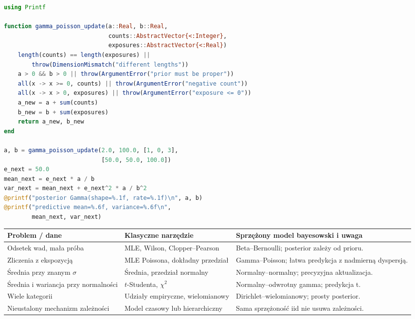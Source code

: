 \begin{lstlisting}[language=Julia,caption={Kompletny program: aktualizacja sprzężona i predykcja gamma--Poisson (Julia, biblioteka standardowa).}]
using Printf

function gamma_poisson_update(a::Real, b::Real,
                              counts::AbstractVector{<:Integer},
                              exposures::AbstractVector{<:Real})
    length(counts) == length(exposures) ||
        throw(DimensionMismatch("different lengths"))
    a > 0 && b > 0 || throw(ArgumentError("prior must be proper"))
    all(x -> x >= 0, counts) || throw(ArgumentError("negative count"))
    all(x -> x > 0, exposures) || throw(ArgumentError("exposure <= 0"))
    a_new = a + sum(counts)
    b_new = b + sum(exposures)
    return a_new, b_new
end

a, b = gamma_poisson_update(2.0, 100.0, [1, 0, 3],
                            [50.0, 50.0, 100.0])
e_next = 50.0
mean_next = e_next * a / b
var_next = mean_next + e_next^2 * a / b^2
@printf("posterior Gamma(shape=%.1f, rate=%.1f)\n", a, b)
@printf("predictive mean=%.6f, variance=%.6f\n",
        mean_next, var_next)
\end{lstlisting}

\begin{center}\small
\begin{tabular}{>{\raggedright\arraybackslash}p{}>{\raggedright\arraybackslash}p{}>{\raggedright\arraybackslash}p{}}
\toprule
\textbf{Problem / dane} & \textbf{Klasyczne narzędzie} & \textbf{Sprzężony model bayesowski i uwaga}\\
\midrule
Odsetek wad, mała próba & MLE, Wilson, Clopper--Pearson & Beta--Bernoulli; posterior zależy od prioru.\\
Zliczenia z ekspozycją & MLE Poissona, dokładny przedział & Gamma--Poisson; łatwa predykcja z nadmierną dyspersją.\\
Średnia przy znanym $\sigma$ & Średnia, przedział normalny & Normalny--normalny; precyzyjna aktualizacja.\\
Średnia i wariancja przy normalności & $t$-Studenta, $\chi^2$ & Normalny--odwrotny gamma; predykcja t.\\
Wiele kategorii & Udziały empiryczne, wielomianowy & Dirichlet--wielomianowy; prosty posterior.\\
Nieustalony mechanizm zależności & Model czasowy lub hierarchiczny & Sama sprzężoność iid nie usuwa zależności.\\
\bottomrule
\end{tabular}
\end{center}

